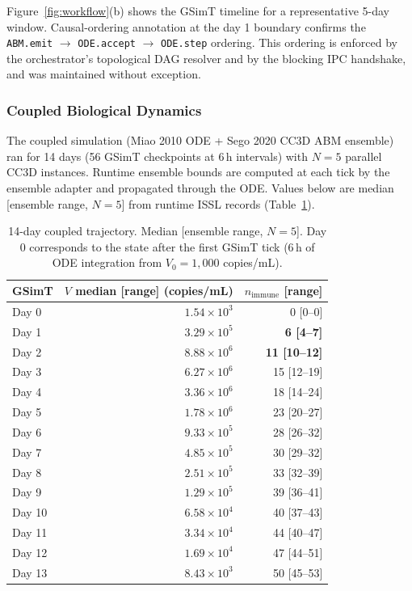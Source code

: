 \documentclass[conference,letterpaper,10pt]{IEEEtran}
\begin{document}
Figure~\ref{fig:workflow}(b) shows the GSimT timeline for a
representative 5-day window. Causal-ordering annotation at the day 1
boundary confirms the \texttt{ABM.emit} $\to$ \texttt{ODE.accept}
$\to$ \texttt{ODE.step} ordering. This ordering is enforced by the
orchestrator's topological DAG resolver and by the blocking IPC
handshake, and was maintained without exception.

\subsubsection{Coupled Biological Dynamics}\label{sec:valid-bio}

The coupled simulation (Miao 2010 ODE + Sego 2020 CC3D ABM ensemble)
ran for 14 days (56 GSimT checkpoints at 6\,h intervals) with $N\!=\!5$
parallel CC3D instances. Runtime ensemble bounds are computed at each
tick by the ensemble adapter and propagated through the ODE. Values
below are median [ensemble range, $N\!=\!5$] from runtime ISSL records
(Table~\ref{tab:trajectory}).

\begin{table}[t]
\centering
\caption{14-day coupled trajectory. Median [ensemble range, $N\!=\!5$].
Day 0 corresponds to the state after the first GSimT tick (6\,h of
ODE integration from $V_0\!=\!1{,}000$ copies/mL).}
\label{tab:trajectory}
\renewcommand{\arraystretch}{1.0}
\footnotesize
\begin{tabular}{lrr}
\toprule
\textbf{GSimT} & \textbf{$V$ median [range]} (copies/mL) & \textbf{$n_{\text{immune}}$} [range]\\
\midrule
Day 0  & $1.54{\times}10^{3}$ & 0 [0--0]\\
Day 1  & $3.29{\times}10^{5}$ & \textbf{6 [4--7]}\\
Day 2  & $8.88{\times}10^{6}$ & \textbf{11 [10--12]}\\
Day 3  & $6.27{\times}10^{6}$ & 15 [12--19]\\
Day 4  & $3.36{\times}10^{6}$ & 18 [14--24]\\
Day 5  & $1.78{\times}10^{6}$ & 23 [20--27]\\
Day 6  & $9.33{\times}10^{5}$ & 28 [26--32]\\
Day 7  & $4.85{\times}10^{5}$ & 30 [29--32]\\
Day 8  & $2.51{\times}10^{5}$ & 33 [32--39]\\
Day 9  & $1.29{\times}10^{5}$ & 39 [36--41]\\
Day 10 & $6.58{\times}10^{4}$ & 40 [37--43]\\
Day 11 & $3.34{\times}10^{4}$ & 44 [40--47]\\
Day 12 & $1.69{\times}10^{4}$ & 47 [44--51]\\
Day 13 & $8.43{\times}10^{3}$ & 50 [45--53]\\
\bottomrule
\end{tabular}
\end{table}
\end{document}
